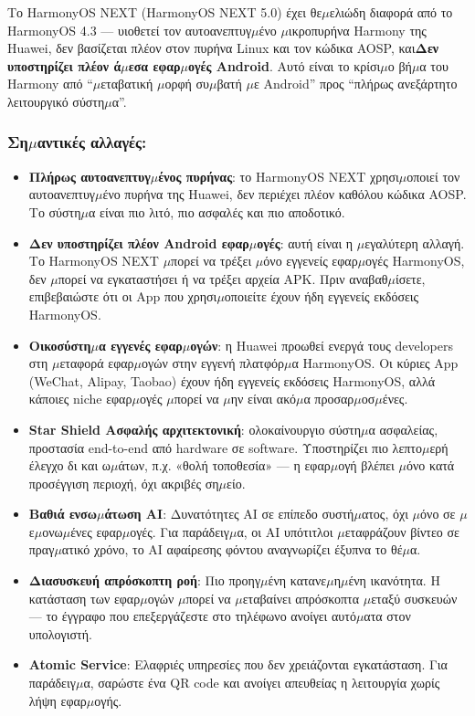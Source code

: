 
Το HarmonyOS NEXT (HarmonyOS NEXT 5.0) έχει θε$\mu$ελιώδη διαφορά από το HarmonyOS 4.3 — υιοθετεί τον αυτοανεπτυγ$\mu$ένο $\mu$ικροπυρήνα Harmony της Huawei, δεν βασίζεται πλέον στον πυρήνα Linux και τον κώδικα AOSP, και\textbf{Δεν υποστηρίζει πλέον ά$\mu$εσα εφαρ$\mu$ογές Android}. Αυτό είναι το κρίσι$\mu$ο βή$\mu$α του Harmony από “$\mu$εταβατική $\mu$ορφή συ$\mu$βατή $\mu$ε Android” προς “πλήρως ανεξάρτητο λειτουργικό σύστη$\mu$α”.

\subsubsection*{Ση$\mu$αντικές αλλαγές:}

\begin{itemize}
  \item \textbf{Πλήρως αυτοανεπτυγ$\mu$ένος πυρήνας}: το HarmonyOS NEXT χρησι$\mu$οποιεί τον αυτοανεπτυγ$\mu$ένο πυρήνα της Huawei, δεν περιέχει πλέον καθόλου κώδικα AOSP. Το σύστη$\mu$α είναι πιο λιτό, πιο ασφαλές και πιο αποδοτικό.
  \item \textbf{Δεν υποστηρίζει πλέον Android εφαρ$\mu$ογές}: αυτή είναι η $\mu$εγαλύτερη αλλαγή. Το HarmonyOS NEXT $\mu$πορεί να τρέξει $\mu$όνο εγγενείς εφαρ$\mu$ογές HarmonyOS, δεν $\mu$πορεί να εγκαταστήσει ή να τρέξει αρχεία APK. Πριν αναβαθ$\mu$ίσετε, επιβεβαιώστε ότι οι App που χρησι$\mu$οποιείτε έχουν ήδη εγγενείς εκδόσεις HarmonyOS.
  \item \textbf{Οικοσύστη$\mu$α εγγενές εφαρ$\mu$ογών}: η Huawei προωθεί ενεργά τους developers στη $\mu$εταφορά εφαρ$\mu$ογών στην εγγενή πλατφόρ$\mu$α HarmonyOS. Οι κύριες App (WeChat, Alipay, Taobao) έχουν ήδη εγγενείς εκδόσεις HarmonyOS, αλλά κάποιες niche εφαρ$\mu$ογές $\mu$πορεί να $\mu$ην είναι ακό$\mu$α προσαρ$\mu$οσ$\mu$ένες.
  \item \textbf{Star Shield Ασφαλής αρχιτεκτονική}: ολοκαίνουργιο σύστη$\mu$α ασφαλείας, προστασία end-to-end από hardware σε software. Υποστηρίζει πιο λεπτο$\mu$ερή έλεγχο δι και ω$\mu$άτων, π.χ. «θολή τοποθεσία» — η εφαρ$\mu$ογή βλέπει $\mu$όνο κατά προσέγγιση περιοχή, όχι ακριβές ση$\mu$είο.
  \item \textbf{Βαθιά ενσω$\mu$άτωση AI}: Δυνατότητες AI σε επίπεδο συστή$\mu$ατος, όχι $\mu$όνο σε $\mu$ε$\mu$ονω$\mu$ένες εφαρ$\mu$ογές. Για παράδειγ$\mu$α, οι AI υπότιτλοι $\mu$εταφράζουν βίντεο σε πραγ$\mu$ατικό χρόνο, το AI αφαίρεσης φόντου αναγνωρίζει έξυπνα το θέ$\mu$α.
  \item \textbf{Διασυσκευή απρόσκοπτη ροή}: Πιο προηγ$\mu$ένη κατανε$\mu$η$\mu$ένη ικανότητα. Η κατάσταση των εφαρ$\mu$ογών $\mu$πορεί να $\mu$εταβαίνει απρόσκοπτα $\mu$εταξύ συσκευών — το έγγραφο που επεξεργάζεστε στο τηλέφωνο ανοίγει αυτό$\mu$ατα στον υπολογιστή.
  \item \textbf{Atomic Service}: Ελαφριές υπηρεσίες που δεν χρειάζονται εγκατάσταση. Για παράδειγ$\mu$α, σαρώστε ένα QR code και ανοίγει απευθείας η λειτουργία χωρίς λήψη εφαρ$\mu$ογής.
\end{itemize}

